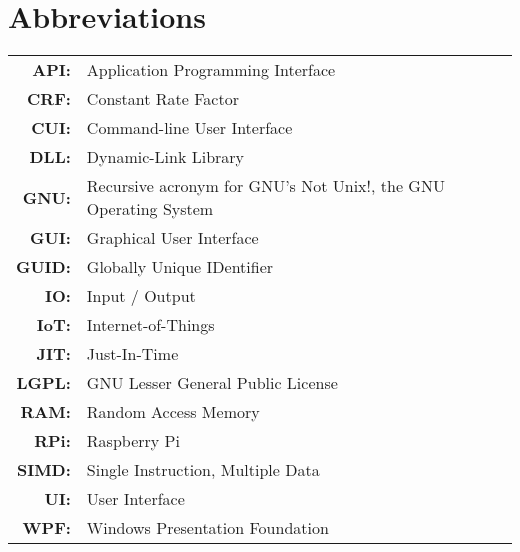 \renewcommand{\baselinestretch}{1}
\chapter{Abbreviations}

\begin{tabular}{rl}
  \vspace{0.1em} \textbf{API:} & Application Programming Interface \\
  \vspace{0.1em} \textbf{CRF:} & Constant Rate Factor \\
  \vspace{0.1em} \textbf{CUI:} & Command-line User Interface \\
  \vspace{0.1em} \textbf{DLL:} & Dynamic-Link Library \\
  \vspace{0.1em} \textbf{GNU:} & Recursive acronym for \ca{``}GNU's Not Unix!\ca{''}, the GNU Operating System \\
  \vspace{0.1em} \textbf{GUI:} & Graphical User Interface \\
  \vspace{0.1em} \textbf{GUID:} & Globally Unique IDentifier \\
  \vspace{0.1em} \textbf{IO:} & Input / Output \\
  \vspace{0.1em} \textbf{IoT:} & Internet-of-Things \\
  \vspace{0.1em} \textbf{JIT:} & Just-In-Time \\
  \vspace{0.1em} \textbf{LGPL:} & GNU Lesser General Public License \\
  \vspace{0.1em} \textbf{RAM:} & Random Access Memory \\
  \vspace{0.1em} \textbf{RPi:} & Raspberry Pi \\
  \vspace{0.1em} \textbf{SIMD:} & Single Instruction, Multiple Data \\
  \vspace{0.1em} \textbf{UI:} & User Interface \\
  \vspace{0.1em} \textbf{WPF:} & Windows Presentation Foundation \\
\end{tabular}

